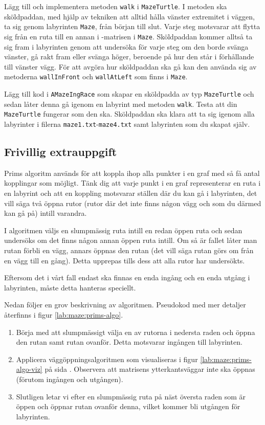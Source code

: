 \Subtask Lägg till och implementera metoden \texttt{walk} i \texttt{MazeTurtle}. I metoden ska sköldpaddan, med hjälp av tekniken att alltid hålla vänster extremitet i väggen, ta sig genom labyrinten \texttt{Maze}, från början till slut. Varje steg motsvarar att flytta sig från en ruta till en annan i -matrisen i \texttt{Maze}. Sköldpaddan kommer alltså ta sig fram i labyrinten genom att undersöka för varje steg om den borde svänga vänster, gå rakt fram eller svänga höger, beroende på hur den står i förhållande till vänster vägg. För att avgöra hur sköldpaddan ska gå kan den använda sig av metoderna \texttt{wallInFront} och \texttt{wallAtLeft} som finns i \texttt{Maze}.

\Subtask Lägg till kod i \texttt{AMazeIngRace} som skapar en sköldpadda av typ \texttt{MazeTurtle} och sedan låter denna gå igenom en labyrint med metoden \texttt{walk}. Testa att din \texttt{MazeTurtle} fungerar som den ska. Sköldpaddan ska klara att ta sig igenom alla labyrinter i filerna \texttt{maze1.txt}-\texttt{maze4.txt} samt labyrinten som du skapat själv.


\subsection{Frivillig extrauppgift}

Prims algoritm används för att koppla ihop alla punkter i en graf med så få antal kopplingar som möjligt. Tänk dig att varje punkt i en graf representerar en ruta i en labyrint och att en koppling motsvarar ställen där du kan gå i labyrinten, det vill säga två öppna rutor (rutor där det inte finns någon vägg och som du därmed kan gå på) intill varandra.

I algoritmen väljs en slumpmässig ruta intill en redan öppen ruta och sedan undersöks om det finns någon annan öppen ruta intill. Om så är fallet låter man rutan förbli en vägg, annars öppnas den rutan (det vill säga rutan görs om från en vägg till en gång). Detta upprepas tills dess att alla rutor har undersökts.

Eftersom det i vårt fall endast ska finnas en enda ingång och en enda utgång i labyrinten, måste detta hanteras speciellt.

Nedan följer en grov beskrivning av algoritmen. Pseudokod med mer detaljer återfinns i figur \ref{lab:maze:prims-algo}.

\begin{enumerate}
	\item Börja med att slumpmässigt välja en av rutorna i nedersta raden och öppna den rutan samt rutan ovanför. Detta motsvarar ingången till labyrinten.
	\item Applicera väggöppningsalgoritmen som visualiseras i figur \ref{lab:maze:prims-algo-viz} på sida \pageref{lab:maze:prims-algo-viz}. Observera att matrisens ytterkantsväggar inte ska öppnas (förutom ingången och utgången).
	\item Slutligen letar vi efter en slumpmässig ruta på näst översta raden som är öppen och öppnar rutan ovanför denna, vilket kommer bli utgången för labyrinten.
\end{enumerate}

